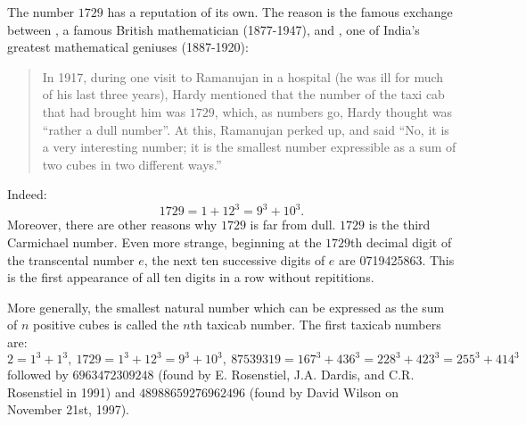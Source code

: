 \documentclass[12pt]{article}
\theoremstyle{definition}
\begin{document}
The number $1729$ has a reputation of its own. The reason is the famous exchange between , a famous British mathematician (1877-1947), and  , one of India's greatest mathematical geniuses (1887-1920):

\begin{quote}
In 1917, during one visit to Ramanujan in a hospital (he was ill for much of his last three years), Hardy mentioned that the number of the taxi cab
that had brought him was $1729$, which, as numbers go, Hardy thought 
was ``rather a dull number''.  At this, Ramanujan perked up, and said
``No, it is a very interesting number; it is the smallest number
expressible as a sum of two cubes in two different ways.''
\end{quote}

Indeed:
$$1729=1+12^3=9^3+10^3.$$
Moreover, there are other reasons why $1729$ is far from dull. $1729$ is the third Carmichael number. Even more strange, beginning at the 
$1729$th decimal digit of the transcental number $e$, the next ten 
successive digits of $e$ are 0719425863. This is the first appearance
of all ten digits in a row without repititions.

More generally, the smallest natural number which can be expressed as the sum of $n$ positive cubes is called the $n$th taxicab number. The first taxicab numbers are:
$$2=1^3+1^3,\ 1729 =1^3+12^3=9^3+10^3,\ 87539319=167^3+436^3=228^3+423^3=255^3+414^3$$
followed by $6963472309248$ (found by E. Rosenstiel, J.A. Dardis, and C.R. Rosenstiel in 1991) and $48988659276962496$ (found by David Wilson on November 21st, 1997).
\end{document}
